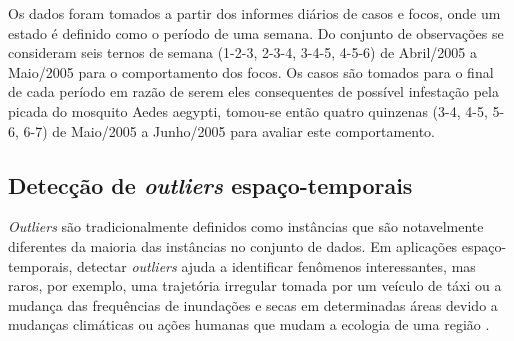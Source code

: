 \begin{figure}[!ht]
	\centering
\end{figure}

Os dados foram tomados a partir dos informes diários de casos e focos, onde um estado é definido como o período de uma semana. Do conjunto de observações se consideram seis ternos de semana (1-2-3, 2-3-4, 3-4-5, 4-5-6) de Abril/2005 a Maio/2005 para o comportamento dos focos. Os casos são tomados para o final de cada período em razão de serem eles consequentes de possível infestação pela picada do mosquito Aedes aegypti, tomou-se então quatro quinzenas (3-4, 4-5, 5-6, 6-7) de Maio/2005 a Junho/2005 para avaliar este comportamento.

\pagebreak

\subsection{Detecção de \textit{outliers} espaço-temporais}
\textit{Outliers} são tradicionalmente definidos como instâncias que são notavelmente diferentes da maioria das instâncias no conjunto de dados. Em aplicações espaço-temporais, detectar \textit{outliers} ajuda a identificar fenômenos interessantes, mas raros, por exemplo, uma trajetória irregular tomada por um veículo de táxi ou a mudança das frequências de inundações e secas em determinadas áreas devido a mudanças climáticas ou ações humanas que mudam a ecologia de uma região \cite{Atluri:2018}.

